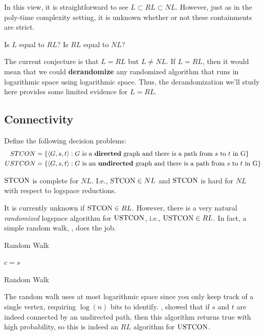 \documentclass{article}
\begin{document}
In this view, it is straightforward to see $L \subset RL \subset NL$. However, just as in the poly-time complexity setting, it is unknown whether or not these containments are strict.


\begin{open-problem}Is $L$ equal to $RL$? Is $RL$ equal to $NL$?
\end{open-problem}

The current conjecture is that $L = RL$ but $L \neq NL$. If $L = RL$, then it would mean that we could \textbf{derandomize} any randomized algorithm that runs in logarithmic space using logarithmic space. Thus, the derandomization we'll study here provides some limited evidence for $L = RL$. 

\subsection{Connectivity}

Define the following decision problems:
\begin{align*}
STCON &= \left\{ \langle G, s, t \rangle : G \text{ is a \textbf{directed} graph and there is a path from $s$ to $t$ in  G}\right\}\\
USTCON &= \left\{ \langle G, s, t \rangle : G \text{ is an \textbf{undirected} graph and there is a path from $s$ to $t$ in  G}\right\}
\end{align*}
\begin{fact}
    $\operatorname{STCON}$ is complete for $NL$. I.e., $\operatorname{STCON} \in NL$ and $\operatorname{STCON}$ is hard for $NL$ with respect to logspace reductions.
\end{fact}

It is currently unknown if $\operatorname{STCON} \in RL$. However, there is a very natural \textit{randomized} logspace algorithm for $\operatorname{USTCON}$, i.e., $\operatorname{USTCON} \in RL$. In fact, a simple random walk, , does the job.
\begin{algorithm}[ht]
    \caption{Random Walk}
    $c = s$\;
    \caption{Random Walk}\label{alg:randomwalk}
\end{algorithm}

The random walk uses at most logarithmic space since you only keep track of a single vertex, requiring $\log(n)$ bits to identify.  \cite{aleliunasRandomWalksUniversal1979}, showed that if $s$ and $t$ are indeed connected by an undirected path, then this algorithm returns true with high probability, so this is indeed an $RL$ algorithm for $\operatorname{USTCON}$.
\end{document}
